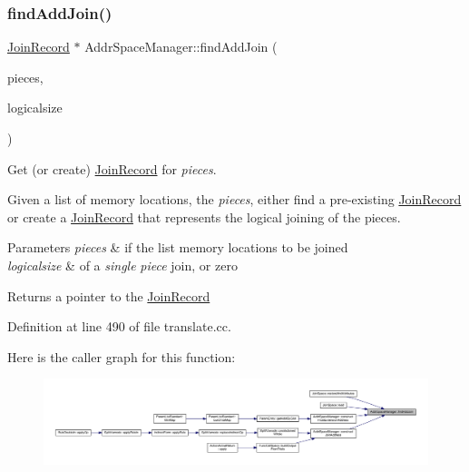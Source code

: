 \subsubsection{\texorpdfstring{findAddJoin()}{findAddJoin()}}
{\footnotesize\ttfamily \mbox{\hyperlink{class_join_record}{Join\+Record}} $\ast$ Addr\+Space\+Manager\+::find\+Add\+Join (\begin{DoxyParamCaption}\item[{const vector$<$ \mbox{\hyperlink{struct_varnode_data}{Varnode\+Data}} $>$ \&}]{pieces,  }\item[{uint4}]{logicalsize }\end{DoxyParamCaption})}



Get (or create) \mbox{\hyperlink{class_join_record}{Join\+Record}} for {\itshape pieces}. 

Given a list of memory locations, the {\itshape pieces}, either find a pre-\/existing \mbox{\hyperlink{class_join_record}{Join\+Record}} or create a \mbox{\hyperlink{class_join_record}{Join\+Record}} that represents the logical joining of the pieces. 
\begin{DoxyParams}{Parameters}
{\em pieces} & if the list memory locations to be joined \\
\hline
{\em logicalsize} & of a {\itshape single} {\itshape piece} join, or zero \\
\hline
\end{DoxyParams}
\begin{DoxyReturn}{Returns}
a pointer to the \mbox{\hyperlink{class_join_record}{Join\+Record}} 
\end{DoxyReturn}


Definition at line 490 of file translate.\+cc.

Here is the caller graph for this function\+:
\nopagebreak
\begin{figure}[H]
\begin{center}
\leavevmode
\includegraphics[width=350pt]{class_addr_space_manager_a1b9e7e934e22b6bea3b2b949fd2b2159_icgraph}
\end{center}
\end{figure}
\mbox{\label{class_addr_space_manager_adff0f9e662ebffdf724dca82b6b544bb}} 

